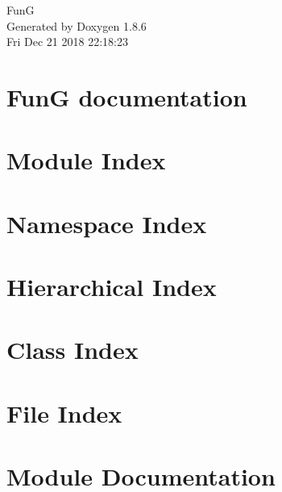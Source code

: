 \documentclass[twoside]{book}
\newcommand{\clearemptydoublepage}{%
  \newpage{\pagestyle{empty}\cleardoublepage}%
}
\begin{document}
\hypersetup{pageanchor=false}
\begin{titlepage}
\vspace*{7cm}
\begin{center}%
{\Large Fun\-G }\\
\vspace*{1cm}
{\large Generated by Doxygen 1.8.6}\\
\vspace*{0.5cm}
{\small Fri Dec 21 2018 22:18:23}\\
\end{center}
\end{titlepage}
\clearemptydoublepage
\tableofcontents
\clearemptydoublepage
{}
\hypersetup{pageanchor=true}

\chapter{Fun\-G documentation}
\label{index}\hypertarget{index}{}
\chapter{Module Index}

\chapter{Namespace Index}

\chapter{Hierarchical Index}

\chapter{Class Index}

\chapter{File Index}

\chapter{Module Documentation}












\end{document}
